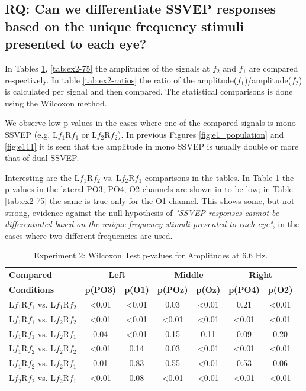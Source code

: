 \subsection{RQ: Can we differentiate SSVEP responses based on the unique frequency stimuli presented to each eye?}


In Tables \ref{tab:ex2-66}, \ref{tab:ex2-75} the amplitudes of the signals at $f_{2}$ and $f_{1}$ are compared respectively. In table \ref{tab:ex2-ratios} the ratio of the amplitude($f_{1}$)/amplitude($f_{2}$) is calculated per signal and then compared. The statistical comparisons is done using the Wilcoxon method.

We observe low p-values in the cases where one of the compared signals is mono SSVEP (e.g. L$f_{1}$R$f_{1}$ or L$f_{2}$R$f_{2}$). In previous Figures \ref{fig:e1_population} and \ref{fig:e111} it is seen that the amplitude in mono SSVEP is usually double or more that of dual-SSVEP. 

Interesting are the L$f_{1}$R$f_{2}$ vs. L$f_{2}$R$f_{1}$ comparisons in the tables. In Table \ref{tab:ex2-66} the p-values in the lateral PO3, PO4, O2 channels are shown in to be low; in Table \ref{tab:ex2-75} the same is true only for the O1 channel. This shows some, but not strong, evidence against the null hypothesis of \textit{"SSVEP responses cannot be differentiated based on the unique frequency stimuli presented to each eye"}, in the cases where two different frequencies are used.






\begin{table}[ht]
\centering
\begin{tabularx}{\linewidth}{l *{6}{c}}
    \toprule
    \textbf{Compared} & \multicolumn{2}{c}{\textbf{Left}} & \multicolumn{2}{c}{\textbf{Middle}} & \multicolumn{2}{c}{\textbf{Right}} \\
    \textbf{Conditions} & \textbf{p(PO3)} & \textbf{p(O1)} & \textbf{p(POz)} & \textbf{p(Oz)} & \textbf{p(PO4)} & \textbf{p(O2)} \\
    \midrule
    L$f_{1}$R$f_{1}$ vs. L$f_{1}$R$f_{2}$ & <0.01 & <0.01 & 0.03 & <0.01 & 0.21 & <0.01 \\
    L$f_{1}$R$f_{1}$ vs. L$f_{2}$R$f_{2}$ & <0.01 & <0.01 & <0.01 & <0.01 & <0.01 & <0.01 \\
    L$f_{1}$R$f_{1}$ vs. L$f_{2}$R$f_{1}$ & 0.04 & <0.01 & 0.15 & 0.11 & 0.09 & 0.20 \\
    L$f_{1}$R$f_{2}$ vs. L$f_{2}$R$f_{2}$ & <0.01 & 0.14 & 0.03 & <0.01 & <0.01 & <0.01 \\
    L$f_{1}$R$f_{2}$ vs. L$f_{2}$R$f_{1}$ & 0.01 & 0.83 & 0.55 & <0.01 & 0.53 & 0.06 \\
    L$f_{2}$R$f_{2}$ vs. L$f_{2}$R$f_{1}$ & <0.01 & 0.08 & <0.01 & <0.01 & <0.01 & <0.01 \\
    \bottomrule
\end{tabularx}
\caption{Experiment 2: Wilcoxon Test p-values for Amplitudes at 6.6 Hz.}
\label{tab:ex2-66}
\end{table}


